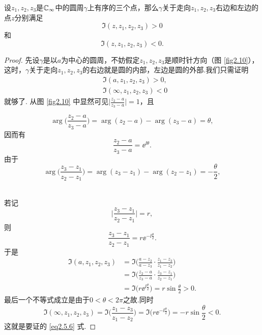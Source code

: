 \begin{prop}\label{prop2.5.9}
  设$z_1,z_2,z_3$是$\mathbb C_\infty$中的圆周$\gamma$上有序的三个点，那么$\gamma$关于走向$z_1,z_2,z_3$右边和左边的点$z$分别满足
  \[
  \Im(z,z_1,z_2,z_3) > 0
  \]
  和
  \[
    \Im(z,z_1,z_2,z_3) < 0.
  \]
\end{prop}
\begin{proof}
  先设$\gamma$是以$a$为中心的圆周，不妨假定$z_1,z_2,z_3$是顺时针方向（图 \ref{fig2.10}），这时，$\gamma$关于走向$z_1,z_2,z_3$的右边就是圆的内部，左边是圆的外部.我们只需证明
  \begin{equation}\label{eq2.5.6}
    \begin{aligned}
      & \Im(a,z_1,z_2,z_3) > 0,\\
      & \Im(\infty,z_1,z_2,z_3) < 0
    \end{aligned}
  \end{equation}
  就够了. 从图 \ref{fig2.10} 中显然可见$\bigg|\frac{z_2-a}{z_3-a}\bigg|=1$，且

  \noindent\begin{minipage}[b]{0.75\textwidth}
  \[
    \arg\bigg(\frac{z_2-a}{z_3-a}\bigg) = \arg(z_2-a) - \arg(z_3-a) = \theta,
  \]
  因而有
  \[
    \frac{z_2-a}{z_3-a} = \ee^{\ii\theta}.
  \]
  由于
  \[
  \arg\bigg(\frac{z_3-z_1}{z_2-z_1}\bigg) = \arg(z_3-z_1) - \arg(z_2-z_1) = -\frac\theta2,
  \]
  \end{minipage}
  \begin{minipage}[b]{0.25\textwidth}
    \centering
  \end{minipage}\\
  若记
  \[
    \bigg| \frac{z_3-z_1}{z_2-z_1} \bigg| = r,
  \]
  则
  \[
    \frac{z_3-z_1}{z_2-z_1} = r\ee^{-\ii\frac\theta2}.
  \]
  于是
  \begin{align*}
    \Im(a,z_1,z_2,z_3) & = \Im\bigg(\frac{a-z_2}{a-z_3} \cdot \frac{z_1-z_3}{z_1-z_2}\bigg)\\
    & = \Im \bigg( \frac{z_2-a}{z_3-a} \cdot \frac{z_3-z_1}{z_2-z_1} \bigg)\\
    & = \Im \big( r\ee^{\ii\frac\theta2} \big) = r\sin\frac\theta2>0.
  \end{align*}
  最后一个不等式成立是由于$0<\theta<2\pi$之故.同时
  \[
    \Im( \infty,z_1,z_2,z_3) = \Im \bigg( \frac{z_1-z_3}{z_1-z_2} \bigg)
    = \Im\big(r\ee^{-\ii\frac\theta2}\big)
    = -r\sin\frac\theta2 < 0.
  \]
  这就是要证的 \eqref{eq2.5.6} 式.


\end{proof}
